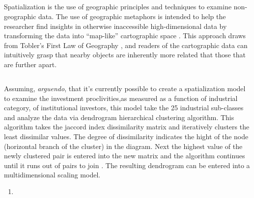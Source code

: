 \documentclass[12pt,letterpaper,notitlepage,onecolumn,final,openbib]{article}
\begin{document}
\subsection{}
Spatialization is the use of geographic principles and techniques to examine non-geographic data\cite{SkupinSpatialization2003}.  The use of geographic metaphors is intended to help the researcher find insights in otherwise inaccessible high-dimensional data by transforming the data into ``map-like'' cartographic space  \cite{SkupinFabrikant2008}.  This approach draws from Tobler's First Law of Geography \cite{toblera1970}, and readers of the cartographic data can intuitively grasp that nearby objects are inherently more related that those that are further apart.      
\subsection{}

Assuming, \textit{arguendo}, that it's currently possible to create a spatialization model to examine the investment proclivities,as measured as a function of industrial category, of institutional investors, this model take the 25 industrial sub-classes and analyze the data via dendrogram hierarchical clustering algorithm.  This algorithm takes the jaccord index dissimilarity matrix and iteratively clusters the least dissimilar values.  The degree of dissimilarity indicates the hight of the node (horizontal branch of the cluster) in the diagram.  Next the highest value of the newly clustered pair is entered into the new matrix and the algorithm continues until it runs out of pairs to join \cite{pathak2014beginning}.   The resulting dendrogram can be entered into a multidimensional scaling model. 

\begin{enumerate}
	\item 
\end{enumerate}
\subsection{}
\subsection{}
\subsection{}


	\pagebreak
	
	
\end{document}
